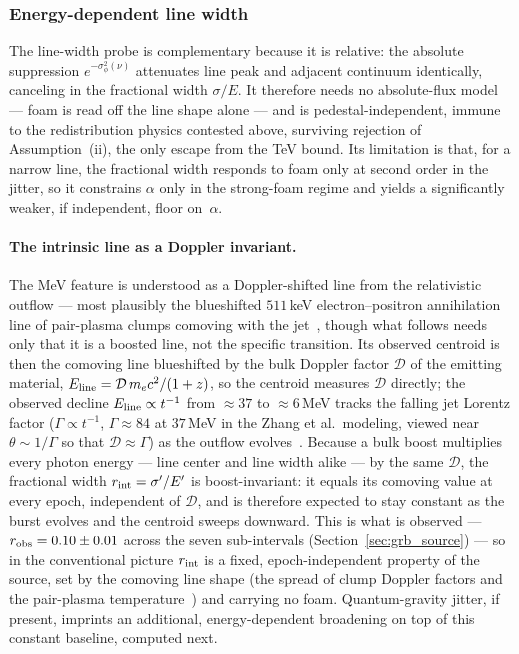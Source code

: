 \documentclass[aps,prd,onecolumn,amsmath,amssymb]{revtex4-2}
\begin{document}
\subsubsection{Energy-dependent line width}
\label{sec:grb_width}

The line-width probe is complementary because it is
relative: the absolute suppression $e^{-\sigma_\phi^2(\nu)}$
attenuates line peak and adjacent continuum identically, canceling in
the fractional width $\sigma/E$.  It therefore needs no absolute-flux
model --- foam is read off the line shape alone --- and is
pedestal-independent, immune to the redistribution physics
contested above, surviving rejection of Assumption~(ii), the only
escape from the TeV bound.  Its limitation is that, for a narrow line,
the fractional width responds to foam only at second order in the jitter,
so it constrains $\alpha$ only in the
strong-foam regime and yields a significantly weaker, if independent,
floor on~$\alpha$.

\paragraph{The intrinsic line as a Doppler invariant.}
The MeV feature is understood as a Doppler-shifted line from the relativistic
outflow --- most plausibly the blueshifted $511$\,keV electron--positron
annihilation line of pair-plasma clumps comoving with the
jet~\cite{Ravasio2024,YQZhang2024}, though what follows needs only that it is a
boosted line, not the specific transition.  Its observed centroid is then the
comoving line blueshifted by the bulk Doppler factor $\mathcal{D}$ of the
emitting material, $E_{\rm line}=\mathcal{D}\,m_ec^2/(1+z)$, so the centroid
measures $\mathcal{D}$ directly; the observed decline
$E_{\rm line}\propto t^{-1}$ from $\approx37$ to $\approx6$\,MeV
tracks the
falling jet Lorentz factor ($\Gamma\propto t^{-1}$, $\Gamma\approx84$ at
$37$\,MeV in the Zhang et al.\ modeling, viewed near $\theta\sim1/\Gamma$ so
that $\mathcal{D}\approx\Gamma$) as the outflow
evolves~\cite{YQZhang2024}.  Because a bulk boost multiplies every photon
energy --- line center and line width alike --- by the same $\mathcal{D}$, the
fractional width $r_{\rm int}=\sigma'/E'$ is boost-invariant: it equals
its comoving value at every epoch, independent of $\mathcal{D}$, and is
therefore expected to stay constant as the burst evolves and the centroid
sweeps downward.  This is what is observed --- $r_{\rm obs}=0.10\pm0.01$ across
the seven sub-intervals (Section~\ref{sec:grb_source}) --- so in the
conventional picture $r_{\rm int}$ is a fixed, epoch-independent property of the
source, set by the comoving line shape (the spread of clump Doppler factors and
the pair-plasma temperature~\cite{YQZhang2024}) and carrying no foam.
Quantum-gravity jitter, if present, imprints an additional,
energy-dependent broadening on top of this constant baseline, computed next.
\end{document}
